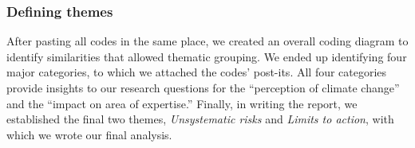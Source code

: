 
\subsubsection{Defining themes}

After pasting all codes in the same place, we created an overall coding diagram to identify similarities that allowed thematic grouping. We ended up identifying four major categories, to which we attached the codes' post-its. %
All four categories provide insights to our research questions for the ``perception of climate change'' and the ``impact on area of expertise.'' Finally, in writing the report, we established the final two themes, \emph{Unsystematic risks} and \emph{Limits to action}, with which we wrote our final analysis.



